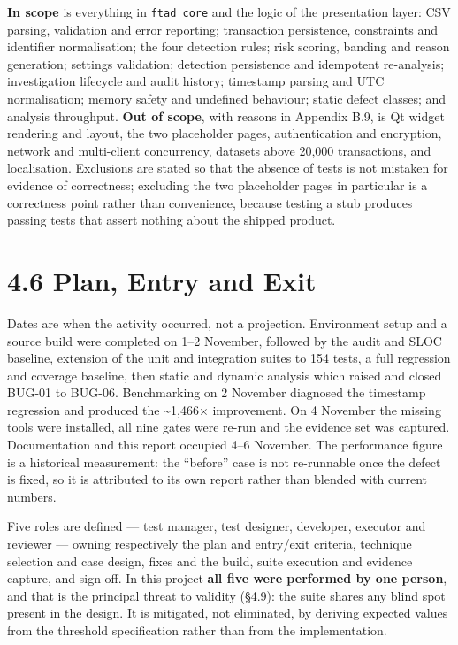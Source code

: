 \documentclass[
  12pt,
]{report}
\begin{document}
\textbf{In scope} is everything in \texttt{ftad\_core} and the logic of
the presentation layer: CSV parsing, validation and error reporting;
transaction persistence, constraints and identifier normalisation; the
four detection rules; risk scoring, banding and reason generation;
settings validation; detection persistence and idempotent re-analysis;
investigation lifecycle and audit history; timestamp parsing and UTC
normalisation; memory safety and undefined behaviour; static defect
classes; and analysis throughput. \textbf{Out of scope}, with reasons in
Appendix B.9, is Qt widget rendering and layout, the two placeholder
pages, authentication and encryption, network and multi-client
concurrency, datasets above 20,000 transactions, and localisation.
Exclusions are stated so that the absence of tests is not mistaken for
evidence of correctness; excluding the two placeholder pages in
particular is a correctness point rather than convenience, because
testing a stub produces passing tests that assert nothing about the
shipped product.

\section{4.6 Plan, Entry and Exit}\label{plan-entry-and-exit}

Dates are when the activity occurred, not a projection. Environment
setup and a source build were completed on 1--2 November, followed by
the audit and SLOC baseline, extension of the unit and integration
suites to 154 tests, a full regression and coverage baseline, then
static and dynamic analysis which raised and closed BUG-01 to BUG-06.
Benchmarking on 2 November diagnosed the timestamp regression and
produced the \textasciitilde1,466× improvement. On 4 November the
missing tools were installed, all nine gates were re-run and the
evidence set was captured. Documentation and this report occupied 4--6
November. The performance figure is a historical measurement: the
``before'' case is not re-runnable once the defect is fixed, so it is
attributed to its own report rather than blended with current numbers.

Five roles are defined --- test manager, test designer, developer,
executor and reviewer --- owning respectively the plan and entry/exit
criteria, technique selection and case design, fixes and the build,
suite execution and evidence capture, and sign-off. In this project
\textbf{all five were performed by one person}, and that is the
principal threat to validity (§4.9): the suite shares any blind spot
present in the design. It is mitigated, not eliminated, by deriving
expected values from the threshold specification rather than from the
implementation.
\end{document}
